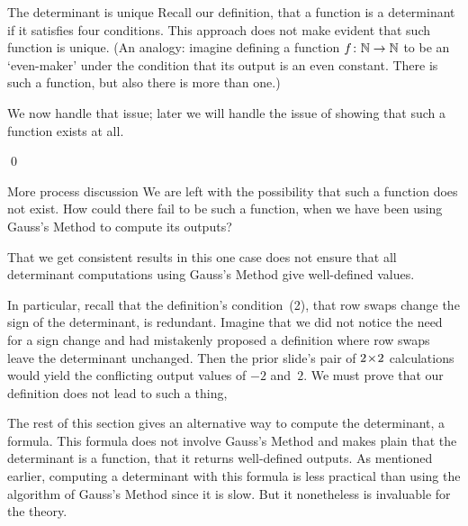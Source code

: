 \documentclass[10pt,t]{beamer}
\begin{document}
\begin{frame}{The  determinant is unique}
Recall our definition, that a function is a determinant if
it satisfies four conditions.
This approach does not make evident that 
such function is unique.
(An analogy: imagine defining a function
$\mbox{$f\colon \mathbb{N}\to \mathbb{N}$}$ to be an `even-maker' under the condition that its 
output is an even constant.
There is such a function, but also there is more than one.)

We now handle that issue; later we will handle the issue of showing that such 
a function exists at all.

\pause
\lm[lm:DetFcnIsUnique]

\pause 
\pf 
{}
\qed

\end{frame}
\begin{frame}{More process discussion}
We are left with the possibility that such a function does not exist.
How could there fail to be such a function, when we have been using 
Gauss's Method to compute its outputs?

That we get consistent results in this one case
does not ensure that all determinant computations using Gauss's Method
give well-defined values.
\end{frame}
\begin{frame}
In particular, recall that the definition's condition~(2),
that row swaps change the sign of the determinant, is 
redundant.
Imagine that we did not notice the need for a sign change and had mistakenly
proposed a definition where row swaps leave the determinant unchanged.
Then the prior slide's pair of $2 \! \times \! 2$ calculations would yield the
conflicting output values of $-2$ and~$2$.
We must prove that our definition does not lead to 
such a thing, 

\pause
The rest of this section gives an alternative way to compute
the determinant, a formula.
This formula does not involve Gauss's Method and
makes plain that the determinant is a function, 
that it returns well-defined outputs.
As mentioned earlier, computing a determinant with this formula  
is less practical than using the algorithm of Gauss's Method since it 
is slow.
But it nonetheless is invaluable for the theory.
\end{frame}
\end{document}

